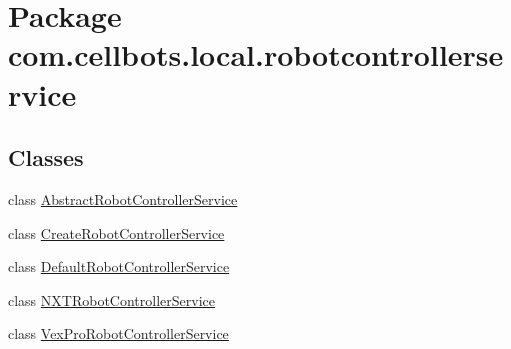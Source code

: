 \hypertarget{namespacecom_1_1cellbots_1_1local_1_1robotcontrollerservice}{\section{Package com.\-cellbots.\-local.\-robotcontrollerservice}
\label{namespacecom_1_1cellbots_1_1local_1_1robotcontrollerservice}
}
\subsection*{Classes}
\begin{DoxyCompactItemize}
\item 
class \hyperlink{classcom_1_1cellbots_1_1local_1_1robotcontrollerservice_1_1_abstract_robot_controller_service}{Abstract\-Robot\-Controller\-Service}
\item 
class \hyperlink{classcom_1_1cellbots_1_1local_1_1robotcontrollerservice_1_1_create_robot_controller_service}{Create\-Robot\-Controller\-Service}
\item 
class \hyperlink{classcom_1_1cellbots_1_1local_1_1robotcontrollerservice_1_1_default_robot_controller_service}{Default\-Robot\-Controller\-Service}
\item 
class \hyperlink{classcom_1_1cellbots_1_1local_1_1robotcontrollerservice_1_1_n_x_t_robot_controller_service}{N\-X\-T\-Robot\-Controller\-Service}
\item 
class \hyperlink{classcom_1_1cellbots_1_1local_1_1robotcontrollerservice_1_1_vex_pro_robot_controller_service}{Vex\-Pro\-Robot\-Controller\-Service}
\end{DoxyCompactItemize}
